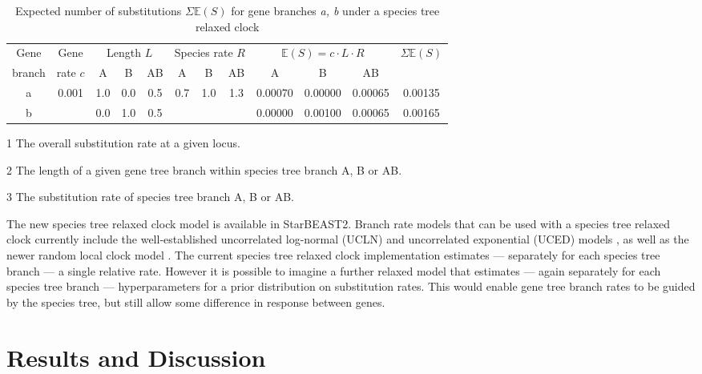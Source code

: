 \documentclass[12pt]{article}
\begin{document}
\begin{table}[htb!]
\caption{Expected number of substitutions $\Sigma \mathbb{E}(S)$ for gene branches \textit{a, b} under a species tree relaxed clock}
\label{tab:branchRateModel}
\begin{threeparttable}
\begin{tabular*}{\textwidth}{@{\extracolsep{\fill}}cccccccccccc@{}}
\hline
Gene & Gene & \multicolumn{3}{c}{Length\tnote{2} $L$} & \multicolumn{3}{c}{Species rate\tnote{3} $R$} & \multicolumn{3}{c}{$\mathbb{E}(S) = c\cdot L\cdot R$} & \multirow{2}{*}{$\Sigma \mathbb{E}(S)$}\tabularnewline
branch & rate\tnote{1} $c$ & A & B & AB & A & B & AB & A & B & AB & \tabularnewline
\hline
a & \multirow{2}{*}{0.001} & 1.0 & 0.0 & 0.5 & \multirow{2}{*}{0.7} & \multirow{2}{*}{1.0} & \multirow{2}{*}{1.3} & 0.00070 & 0.00000 & 0.00065 & 0.00135\tabularnewline
b & & 0.0 & 1.0 & 0.5 & & & & 0.00000 & 0.00100 & 0.00065 & 0.00165\tabularnewline
\hline
\end{tabular*}
\begin{tablenotes}
\item[1] The overall substitution rate at a given locus.
\item[2] The length of a given gene tree branch within species tree branch A, B or AB.
\item[3] The substitution rate of species tree branch A, B or AB.
\end{tablenotes}
\end{threeparttable}
\end{table}

The new species tree relaxed clock model is available in StarBEAST2. Branch
rate models that can be used with a species tree relaxed clock currently
include the well-established uncorrelated log-normal (UCLN) and uncorrelated
exponential (UCED) models \citep{10.1371/journal.pbio.0040088}, as well as the
newer random local clock model \citep{Drummond2010}. The current species tree
relaxed clock implementation estimates --- separately for each species tree
branch --- a single relative rate. However it is possible to imagine a further
relaxed model that estimates --- again separately for each species tree branch
--- hyperparameters for a prior distribution on substitution rates. This would
enable gene tree branch rates to be guided by the species tree, but still
allow some difference in response between genes.

\section{Results and Discussion}
\end{document}
